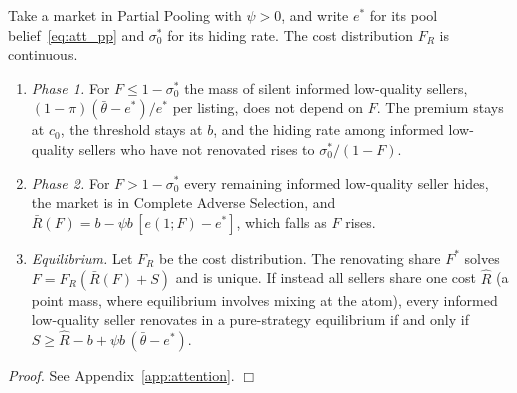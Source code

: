\documentclass[10pt,letterpaper]{bp-template-concise}
\begin{document}
\begin{proposition}
\label{prop:subsidy_ge}
Take a market in Partial Pooling with $\psi>0$, and write $e^*$ for its pool belief~\eqref{eq:att_pp} and $\sigma_0^*$ for its hiding rate. The cost distribution $F_R$ is continuous.
\begin{enumerate}[label=(\roman*)]
    \item \emph{Phase 1.} For $F\le1-\sigma_0^*$ the mass of silent informed low-quality sellers, $(1-\pi)(\bar\theta-e^*)/e^*$ per listing, does not depend on $F$. The premium stays at $c_0$, the threshold stays at $b$, and the hiding rate among informed low-quality sellers who have not renovated rises to $\sigma_0^*/(1-F)$.
    \item \emph{Phase 2.} For $F>1-\sigma_0^*$ every remaining informed low-quality seller hides, the market is in Complete Adverse Selection, and $\bar R(F)=b-\psi b\,[e(1;F)-e^*]$, which falls as $F$ rises.
    \item \emph{Equilibrium.} Let $F_R$ be the cost distribution. The renovating share $F^*$ solves $F=F_R(\bar R(F)+S)$ and is unique. If instead all sellers share one cost $\hat R$ (a point mass, where equilibrium involves mixing at the atom), every informed low-quality seller renovates in a pure-strategy equilibrium if and only if $S\ge\hat R-b+\psi b\,(\bar\theta-e^*)$.
\end{enumerate}
\end{proposition}

\noindent\textit{Proof.} See Appendix~\ref{app:attention}. $\Box$

\medskip
\end{document}
